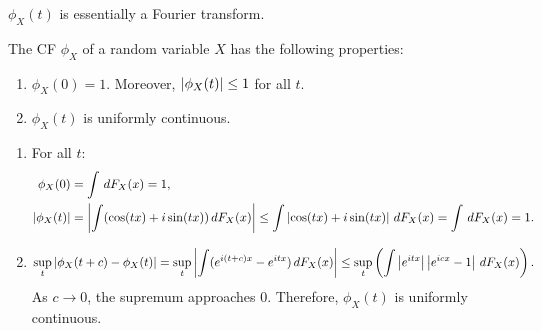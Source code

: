 \documentclass{huhtakm-template-book-v2}
\begin{document}
    \begin{rem}
        $\phi_{X}(t)$ is essentially a Fourier transform.
    \end{rem}
    \begin{lem}
        The CF $\phi_{X}$ of a random variable $X$ has the following properties:
        \begin{enumerate}
            \item $\phi_{X}(0) = 1$. Moreover, $\left|{\phi_{X}(t)}\right| \leq 1$ for all $t$.
            \item $\phi_{X}(t)$ is uniformly continuous.
        \end{enumerate}
    \end{lem}
    \begin{proofing}
        \begin{enumerate}
            \item For all $t$:
            \begin{align*}
                \phi_{X}(0) &= \int\,dF_{X}(x) = 1,\\
                \left|{\phi_{X}(t)}\right| &= \left|{\int(\cos(tx)+i\sin(tx))\,dF_{X}(x)}\right| \leq \int\left|{\cos(tx)+i\sin(tx)}\right|\,dF_{X}(x) = \int\,dF_{X}(x) = 1.
            \end{align*}
            \item
            \begin{equation*}
                \sup_{t}\left|{\phi_{X}(t+c)-\phi_{X}(t)}\right| = \sup_{t}\left|{\int(e^{i(t+c)x}-e^{itx})\,dF_{X}(x)}\right| \leq \sup_{t}\left(\int\left|{e^{itx}}\right|\left|{e^{icx}-1}\right|\,dF_{X}(x)\right).
            \end{equation*}
            As $c \to 0$, the supremum approaches $0$. Therefore, $\phi_{X}(t)$ is uniformly continuous.
        \end{enumerate}
    \end{proofing}
    \newpage
\end{document}
